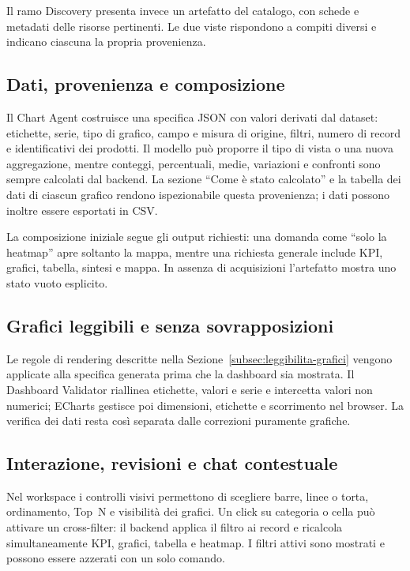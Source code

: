 Il ramo Discovery presenta invece un artefatto del catalogo, con schede e
metadati delle risorse pertinenti. Le due viste rispondono a compiti diversi e
indicano ciascuna la propria provenienza.

\subsection{Dati, provenienza e composizione}

Il Chart Agent costruisce una specifica JSON con valori derivati dal dataset:
etichette, serie, tipo di grafico, campo e misura di origine, filtri, numero di
record e identificativi dei prodotti. Il modello può proporre il tipo di vista
o una nuova aggregazione, mentre conteggi, percentuali, medie, variazioni e
confronti sono sempre calcolati dal backend. La sezione ``Come è stato
calcolato'' e la tabella dei dati di ciascun grafico rendono ispezionabile
questa provenienza; i dati possono inoltre essere esportati in CSV.

La composizione iniziale segue gli output richiesti: una domanda come ``solo
la heatmap'' apre soltanto la mappa, mentre una richiesta generale include
KPI, grafici, tabella, sintesi e mappa. In assenza di acquisizioni l'artefatto
mostra uno stato vuoto esplicito.

\subsection{Grafici leggibili e senza sovrapposizioni}

Le regole di rendering descritte nella
Sezione~\ref{subsec:leggibilita-grafici} vengono applicate alla specifica
generata prima che la dashboard sia mostrata. Il Dashboard Validator riallinea
etichette, valori e serie e intercetta valori non numerici; ECharts gestisce poi
dimensioni, etichette e scorrimento nel browser. La verifica dei dati resta
così separata dalle correzioni puramente grafiche.

\subsection{Interazione, revisioni e chat contestuale}

Nel workspace i controlli visivi permettono di scegliere barre, linee o torta,
ordinamento, Top~N e visibilità dei grafici. Un click su categoria o cella può
attivare un cross-filter: il backend applica il filtro ai record e ricalcola
simultaneamente KPI, grafici, tabella e heatmap. I filtri attivi sono mostrati
e possono essere azzerati con un solo comando.

